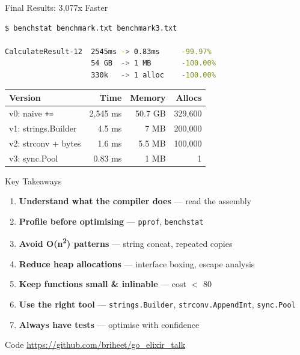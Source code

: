 \documentclass{beamer}
\begin{document}
\begin{frame}[fragile]{Final Results: 3,077x Faster}

  \begin{lstlisting}[language=bash]
$ benchstat benchmark.txt benchmark3.txt

CalculateResult-12  2545ms -> 0.83ms     -99.97%
                    54 GB  -> 1 MB       -100.00%
                    330k   -> 1 alloc    -100.00%
  \end{lstlisting}

  \vspace{0.3cm}
  \begin{center}
    \begin{tabular}{l r r r}
      \hline
      \textbf{Version} & \textbf{Time} & \textbf{Memory} & \textbf{Allocs} \\
      \hline
      v0: naive \texttt{+=} & 2,545 ms & 50.7 GB & 329,600 \\
      v1: strings.Builder & 4.5 ms & 7 MB & 200,000 \\
      v2: strconv + bytes & 1.6 ms & 5.5 MB & 100,000 \\
      v3: sync.Pool & \alert{0.83 ms} & \alert{1 MB} & \alert{1} \\
      \hline
    \end{tabular}
  \end{center}

\end{frame}

\begin{frame}{Key Takeaways}

  \begin{enumerate}
    \item \textbf{Understand what the compiler does} --- read the assembly
    \item \textbf{Profile before optimising} --- \texttt{pprof}, \texttt{benchstat}
    \item \textbf{Avoid O(n\textsuperscript{2}) patterns} --- string concat, repeated copies
    \item \textbf{Reduce heap allocations} --- interface boxing, escape analysis
    \item \textbf{Keep functions small \& inlinable} --- cost $<$ 80
    \item \textbf{Use the right tool} --- \texttt{strings.Builder}, \texttt{strconv.AppendInt}, \texttt{sync.Pool}
    \item \textbf{Always have tests} --- optimise with confidence
  \end{enumerate}

  \vspace{0.5cm}
  \begin{block}{Code}
    \url{https://github.com/briheet/go\_elixir\_talk}
  \end{block}

\end{frame}
\end{document}
